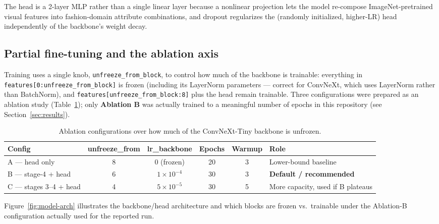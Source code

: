 \documentclass[11pt]{article}
\newcommand{\code}[1]{\texttt{\small #1}}
\begin{document}
The head is a 2-layer MLP rather than a single linear layer because a nonlinear projection lets the model re-compose ImageNet-pretrained visual features into fashion-domain attribute combinations, and dropout regularizes the (randomly initialized, higher-LR) head independently of the backbone's weight decay.

\subsection{Partial fine-tuning and the ablation axis}

Training uses a single knob, \code{unfreeze\_from\_block}, to control how much of the backbone is trainable: everything in \code{features[0:unfreeze\_from\_block]} is frozen (including its LayerNorm parameters --- correct for ConvNeXt, which uses LayerNorm rather than BatchNorm), and \code{features[unfreeze\_from\_block:8]} plus the head remain trainable. Three configurations were prepared as an ablation study (Table~\ref{tab:ablation-configs}); only \textbf{Ablation B} was actually trained to a meaningful number of epochs in this repository (see Section~\ref{sec:results}).

\begin{table}[h]
\centering
\begin{tabular}{lccccl}
\toprule
\textbf{Config} & \textbf{unfreeze\_from} & \textbf{lr\_backbone} & \textbf{Epochs} & \textbf{Warmup} & \textbf{Role} \\
\midrule
A --- head only     & 8 & 0 (frozen)      & 20 & 3 & Lower-bound baseline \\
\rowcolor{cobalt!8} B --- stage-4 + head & 6 & $1\times10^{-4}$ & 30 & 3 & \textbf{Default / recommended} \\
C --- stages 3--4 + head & 4 & $5\times10^{-5}$ & 30 & 5 & More capacity, used if B plateaus \\
\bottomrule
\end{tabular}
\caption{Ablation configurations over how much of the ConvNeXt-Tiny backbone is unfrozen.}
\label{tab:ablation-configs}
\end{table}

Figure~\ref{fig:model-arch} illustrates the backbone/head architecture and which blocks are frozen vs.\ trainable under the Ablation-B configuration actually used for the reported run.
\end{document}
